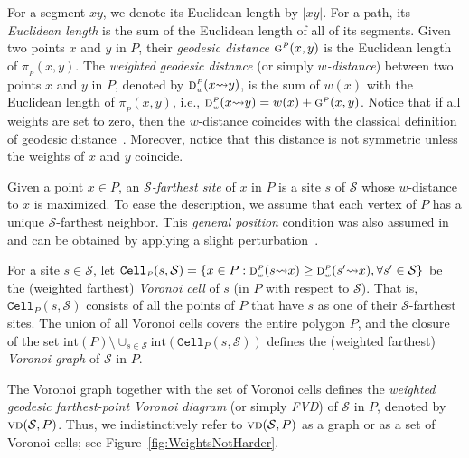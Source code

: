 \documentclass[a4paper, 11pt]{article}
\newcommand{\s}{\mathcal S}
\newcommand{\g}[3][P]{\ensuremath{\textsc{g}^{\scriptscriptstyle #1}(#2, #3)}}
\newcommand{\dd}[3][P]{\ensuremath{\textsc{d}_{\scriptscriptstyle w}^{\scriptscriptstyle #1}(#2 {\leadsto} #3)}}
\newcommand{\p}[3][P]{\ensuremath{\pi_{_{#1}}(#2, #3)}}
\newcommand{\cell}[2][P]{\ensuremath{\mathtt{Cell}_{\scriptscriptstyle #1}(#2)}}
\newcommand{\interior}[1]{\mathrm{int}(#1)}
\newcommand{\vd}[2][P]{\textsc{vd}(#2, #1)}
\begin{document}
For a segment $xy$, we denote its Euclidean length by $|xy|$. For a path, its \emph{Euclidean length} is the sum of the Euclidean length of all of its segments. Given two points $x$ and $y$ in $P$, their \emph{geodesic distance} $\g{x}{y}$ is the Euclidean length of $\p{x}{y}$.
The \emph{weighted geodesic distance} (or simply \emph{$w$-distance}) between two points $x$ and $y$ in $P$, denoted by $\dd{x}{y}$, is the sum of $w(x)$ with the Euclidean length of $\p{x}{y}$, i.e., $\dd{x}{y} = w(x) + \g{x}{y}$. Notice that if all weights are set to zero, then the $w$-distance coincides with the classical definition of geodesic distance~\cite{m-gspno-00}. 
Moreover, notice that this distance is not symmetric unless the weights of $x$ and $y$ coincide. 

Given a point $x\in P$, an \emph{$\s$-farthest site} of $x$ in $P$ is a site  $s$ of  $\s$ whose $w$-distance to $x$ is maximized.
To ease the description, we assume that each vertex of $P$ has a unique $\s$-farthest neighbor. 
This \emph{general position} condition was also assumed in~\cite{ahn2015linear,aronov1993furthest,oh2016farthest} and can be obtained by applying a slight perturbation~\cite{edelsbrunner1990simulation}.

For a site $s\in \s$, let $\cell{s,\s} = \{x\in P: \dd{s}{x} \geq \dd{s'}{x}, \forall s'\in \s\}$ be the (weighted farthest) \emph{Voronoi cell} of $s$ (in $P$ with respect to $\s$). 
That is, $\cell{s,\s}$ consists of all the points of $P$ that have $s$ as one of their $\s$-farthest sites.
The union of all Voronoi cells covers the entire polygon $P$, and the closure of the set $\interior{P} \setminus \cup_{s \in \s} \interior{\cell{s,\s}}$ defines the (weighted farthest) \emph{Voronoi graph} of $\s$ in $P$. 

The Voronoi graph together with the set of Voronoi cells defines the \emph{weighted geodesic farthest-point
Voronoi diagram} (or simply \emph{FVD}) of $\s$ in $P$, denoted by $\vd{\s}$.
Thus, we indistinctively refer to $\vd{\s}$ as a graph or as a set of Voronoi cells; see Figure~\ref{fig:WeightsNotHarder}.
\end{document}

